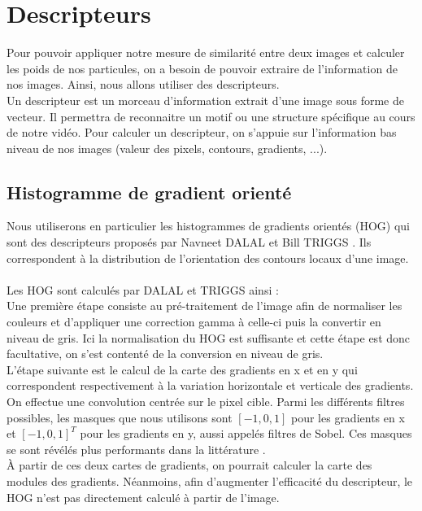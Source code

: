 \section{Descripteurs}
Pour pouvoir appliquer notre mesure de similarité entre deux images et calculer les poids de nos particules, on a besoin de pouvoir extraire de l'information de nos images. Ainsi, nous allons utiliser des descripteurs. \\
Un descripteur est un morceau d'information extrait d'une image sous forme de vecteur. Il permettra de reconnaitre un motif ou une structure spécifique au cours de notre vidéo. Pour calculer un descripteur, on s'appuie sur l'information bas niveau de nos images (valeur des pixels, contours, gradients, ...).

\subsection{Histogramme de gradient orienté}

Nous utiliserons en particulier les histogrammes de gradients orientés (HOG) qui sont des descripteurs proposés par Navneet DALAL et Bill TRIGGS \cite{dalal_histograms_2005}. Ils correspondent à la distribution de l'orientation des contours locaux d'une image. \\
\\
Les HOG sont calculés par DALAL et TRIGGS ainsi : \\

Une première étape consiste au pré-traitement de l'image afin de normaliser les couleurs et d'appliquer une correction gamma à celle-ci puis la convertir en niveau de gris. Ici la normalisation du HOG est suffisante et cette étape est donc facultative, on s'est contenté de la conversion en niveau de gris. \\

L'étape suivante est le calcul de la carte des gradients en x et en y qui correspondent respectivement à la variation horizontale et verticale des gradients. On effectue une convolution centrée sur le pixel cible. Parmi les différents filtres possibles, les masques que nous utilisons sont $[-1, 0, 1]$ pour les gradients en x et $[-1, 0, 1]^{T}$ pour les gradients en y, aussi appelés filtres de Sobel. Ces masques se sont révélés plus performants dans la littérature \cite{dalal_histograms_2005}.\\

À partir de ces deux cartes de gradients, on pourrait calculer la carte des modules des gradients. Néanmoins, afin d'augmenter l'efficacité du descripteur, le HOG n'est pas directement calculé à partir de l'image.\\

